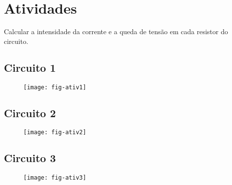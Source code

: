 \section{Atividades}

Calcular a intensidade da corrente e a queda de tensão em cada resistor do circuito.

\subsection{ Circuito 1}
\begin{figure}[H]
  \centering
  \label{fig:ativ1}
  \texttt{[image: fig-ativ1]}
\end{figure}

\subsection{ Circuito 2}
\begin{figure}[H]
  \centering
  \label{fig:ativ1}
  \texttt{[image: fig-ativ2]}
\end{figure}

\subsection{ Circuito 3}
\begin{figure}[H]
  \centering
  \label{fig:ativ1}
  \texttt{[image: fig-ativ3]}
\end{figure}
